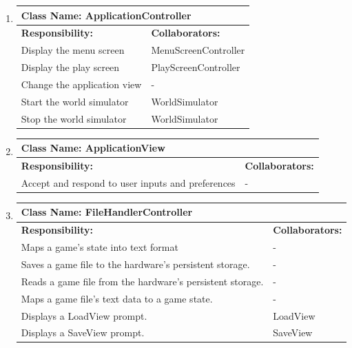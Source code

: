 \documentclass[]{article}
\begin{document}
\begin{enumerate}[1.]

	\item
	\begin{tabular}{|p{10cm}|p{4cm}|}
	    \hline
	     \multicolumn{2}{|l|}{\textbf{Class Name:  ApplicationController}} \\
	    \hline
	    \textbf{Responsibility:} & \textbf{Collaborators:} \\
	    \hline
	    Display the menu screen & MenuScreenController \\
	Display the play screen & PlayScreenController \\
	Change the application view & - \\
	Start the world simulator & WorldSimulator \\
	Stop the world simulator & WorldSimulator \\

	    \hline
	  \end{tabular}

	\item
	\begin{tabular}{|p{10cm}|p{4cm}|}
	    \hline
	     \multicolumn{2}{|l|}{\textbf{Class Name:  ApplicationView}} \\
	    \hline
	    \textbf{Responsibility:} & \textbf{Collaborators:} \\
	    \hline
	    Accept and respond to user inputs and preferences & - \\

	    \hline
	  \end{tabular}

	\item
	\begin{tabular}{|p{10cm}|p{4cm}|}
	    \hline
	     \multicolumn{2}{|l|}{\textbf{Class Name:  FileHandlerController}} \\
	    \hline
	    \textbf{Responsibility:} & \textbf{Collaborators:} \\
	    \hline
	    Maps a game’s state into text format & - \\
	Saves a game file to the hardware’s persistent storage. & - \\
	Reads a game file from the hardware’s persistent storage. & - \\
	Maps a game file’s text data to a game state. & - \\
	Displays a LoadView prompt. & LoadView \\
	Displays a SaveView prompt. & SaveView \\


\end{tabular}
\end{enumerate}
\end{document}
